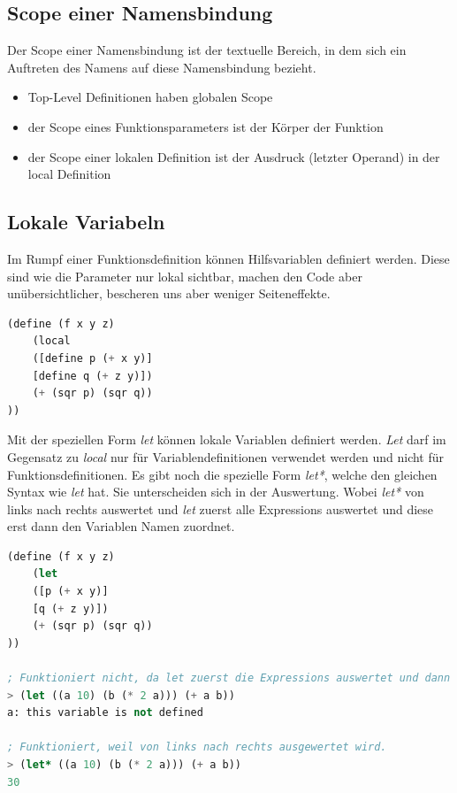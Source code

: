 \subsection{Scope einer Namensbindung}
Der Scope einer Namensbindung ist der textuelle Bereich, in dem sich ein Auftreten des Namens auf diese Namensbindung bezieht.
\begin{itemize}
	\item Top-Level Definitionen haben globalen Scope
	\item der Scope eines Funktionsparameters ist der Körper der Funktion
	\item der Scope einer lokalen Definition ist der Ausdruck (letzter Operand) in der local Definition
\end{itemize}

\subsection{Lokale Variabeln}
Im Rumpf einer Funktionsdefinition können Hilfsvariablen definiert werden. Diese sind wie die Parameter nur lokal sichtbar, machen den Code aber unübersichtlicher, bescheren uns aber weniger Seiteneffekte.

\begin{lstlisting}[language=Lisp, caption=Lokale Variablen mit local]
(define (f x y z)
	(local
	([define p (+ x y)]
	[define q (+ z y)])
	(+ (sqr p) (sqr q))
))
\end{lstlisting}

Mit der speziellen Form \emph{let} können lokale Variablen definiert werden. \emph{Let} darf im Gegensatz zu \emph{local} nur für Variablendefinitionen verwendet werden und nicht für Funktionsdefinitionen. Es gibt noch die spezielle Form \emph{let*}, welche den gleichen Syntax wie \emph{let} hat. Sie unterscheiden sich in der Auswertung. Wobei \emph{let*} von links nach rechts auswertet und \emph{let} zuerst alle Expressions auswertet und diese erst dann den Variablen Namen zuordnet.

\begin{lstlisting}[language=Lisp, caption=Lokale Variablen mit let]
(define (f x y z)
	(let
	([p (+ x y)]
	[q (+ z y)])
	(+ (sqr p) (sqr q))
))

; Funktioniert nicht, da let zuerst die Expressions auswertet und dann erst die Zuweisung macht. Die Variable a muss vorgängig definiert werden.
> (let ((a 10) (b (* 2 a))) (+ a b))
a: this variable is not defined

; Funktioniert, weil von links nach rechts ausgewertet wird.
> (let* ((a 10) (b (* 2 a))) (+ a b))
30
\end{lstlisting}

